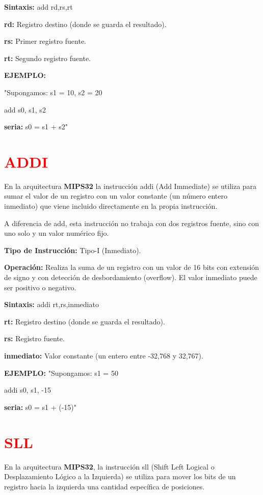 \documentclass[12pt,a4paper]{article}
\begin{document}
\textbf{Sintaxis:} add rd,rs,rt

\textbf{rd:} Registro destino (donde se guarda el resultado).

\textbf{rs:} Primer registro fuente.

\textbf{rt:} Segundo registro fuente.

\textbf{EJEMPLO:}

"Supongamos: s1 = 10, s2 = 20

add s0, s1, s2

\textbf{seria:} s0 = s1 + s2"

\section{\textcolor{red}{ADDI}}
En la arquitectura \textbf{MIPS32} la instrucción addi (Add Immediate) se utiliza para sumar el valor de un registro con un valor constante (un número entero inmediato) que viene incluido directamente en la propia instrucción.

A diferencia de add, esta instrucción no trabaja con dos registros fuente, sino con uno solo y un valor numérico fijo.

\textbf{Tipo de Instrucción:} Tipo-I (Inmediato).

\textbf{Operación:} Realiza la suma de un registro con un valor de 16 bits con extensión de signo y con detección de desbordamiento (overflow). El valor inmediato puede ser positivo o negativo.

\textbf{Sintaxis:}
addi rt,rs,inmediato

\textbf{rt:} Registro destino (donde se guarda el resultado).

\textbf{rs:} Registro fuente.

\textbf{inmediato:} Valor constante (un entero entre -32,768 y 32,767).

\textbf{EJEMPLO:}
"Supongamos: s1 = 50

addi s0, s1, -15

\textbf{seria:} s0 = s1 + (-15)"


\section{\textcolor{red}{SLL}}

En la arquitectura \textbf{MIPS32}, la instrucción sll (Shift Left Logical o Desplazamiento Lógico a la Izquierda) se utiliza para mover los bits de un registro hacia la izquierda una cantidad específica de posiciones.
\end{document}
